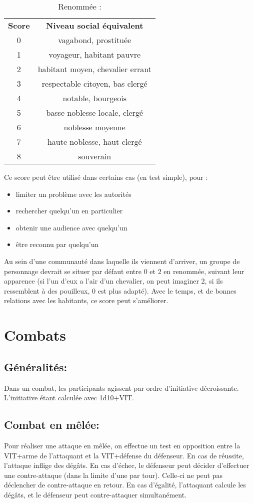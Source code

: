 \documentclass[10pt,a4paper,twocolumn]{book}
\begin{document}
\begin{table}
\caption{ Renommée :}
\label{tableRenommée}
\begin{center}
\begin{tabular}{cc}
\textbf{Score} & \textbf{Niveau social équivalent} \\
   0 & vagabond, prostituée  \\
   1 & voyageur, habitant pauvre  \\
   2 & habitant moyen, chevalier errant \\
   3 & respectable citoyen, bas clergé\\
   4 & notable, bourgeois \\
   5 & basse noblesse locale, clergé \\
   6 & noblesse moyenne \\
   7 & haute noblesse, haut clergé \\
   8 & souverain \\
\end{tabular}
\end{center}
\end{table}
Ce score peut être utilisé dans certains cas (en test simple), pour : 
\begin{itemize}
\item{}limiter un problème avec les autorités
\item{}rechercher quelqu’un en particulier
\item{}obtenir une audience avec quelqu’un
\item{}être reconnu par quelqu’un
\end{itemize}

Au sein d’une communauté dans laquelle ils viennent d’arriver, un groupe de personnage devrait se situer par défaut entre 0 et 2 en renommée, suivant leur apparence (si l’un d’eux a l’air d’un chevalier, on peut imaginer 2, si ils ressemblent à des pouilleux, 0 est plus adapté). Avec le temps, et de bonnes relations avec les habitants, ce score peut s’améliorer.

\section{Combats}
\subsection{Généralités:}
Dans un combat, les participants agissent par ordre d’initiative décroissante. L’initiative étant calculée avec 1d10+VIT.
\subsection{Combat en mêlée:}
Pour réaliser une attaque en mêlée, on effectue un test en opposition entre la VIT+arme de l’attaquant et la VIT+défense du défenseur.
    En cas de réussite, l’attaque inflige des dégâts.
    En cas d’échec, le défenseur peut décider d’effectuer une contre-attaque (dans la limite d’une par tour). Celle-ci ne peut pas déclencher de contre-attaque en retour.
    En cas d’égalité, l’attaquant calcule les dégâts, et le défenseur peut contre-attaquer simultanément.
    
\end{document}
